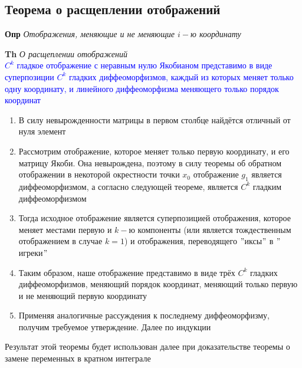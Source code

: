 \subsection{Теорема о расщеплении отображений}

\textbf{Опр} \textit{Отображения, меняющие и не меняющие $i-$ю координату}

\textbf{Th} \textit{О расщеплении отображений} \\
\textcolor{blue}{$C^k$ гладкое отображение с неравным нулю Якобианом представимо в виде суперпозиции $C^k$ гладких
диффеоморфизмов, каждый из которых меняет только одну координату, и линейного диффеоморфизма меняющего только порядок
координат}

\begin{enumerate}
    \item В силу невырожденности матрицы в первом столбце найдётся отличный от нуля элемент
    \item Рассмотрим отображение, которое меняет  только  первую  координату, и его матрицу Якоби.
    Она невырождена, поэтому в силу теоремы об обратном отображении в некоторой окрестности точки $x_0$ отображение $
    g_1$ является диффеоморфизмом, а согласно следующей теореме, является $C^k$ гладким диффеоморфизмом
    \item Тогда исходное отображение является суперпозицией отображения, которое меняет местами первую и $k-$ю
    компоненты (или является тождественным отображением в случае $k = 1$) и отображения, переводящего \("\)иксы\("\) в \("\)игреки\("\)
    \item Таким образом, наше отображение представимо в виде трёх $C^k$ гладких диффеоморфизмов, меняющий порядок
    координат, меняющий только первую и не меняющий первую координату
    \item Применяя аналогичные рассуждения к последнему диффеоморфизму, получим требуемое утверждение.
    Далее по индукции
\end{enumerate}

Результат этой теоремы будет использован далее при доказательстве теоремы о замене переменных в кратном интеграле


